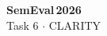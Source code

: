 \documentclass[border=3mm,varwidth]{standalone}
\begin{document}
\color{purpleDeep}\centering
{\fontsize{40}{44}\selectfont\bfseries SemEval\,2026}\\[2mm]
{\Large Task 6 \;$\cdot$\; CLARITY}%
\end{document}
